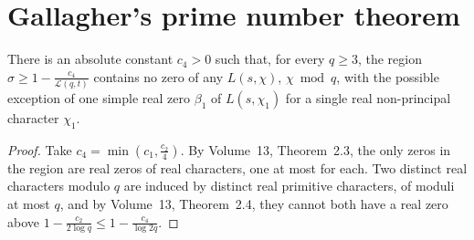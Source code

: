 \section{Gallagher's prime number theorem}

\begin{lemma}\label{lem:onezero}
There is an absolute constant $c_4>0$ such that, for every $q\ge3$, the region $\sigma\ge1-\frac{c_4}{\mathcal L(q,t)}$ contains no zero of any $L(s,\chi)$, $\chi\bmod q$, with the possible exception of one simple real zero $\beta_1$ of $L(s,\chi_1)$ for a single real non-principal character $\chi_1$.
\end{lemma}
\begin{proof}
Take $c_4=\min(c_1,\frac{c_2}4)$. By Volume~13, Theorem~2.3, the only zeros in the region are real zeros of real characters, one at most for each. Two distinct real characters modulo $q$ are induced by distinct real primitive characters, of moduli at most $q$, and by Volume~13, Theorem~2.4, they cannot both have a real zero above $1-\frac{c_2}{2\log q}\le1-\frac{c_4}{\log 2q}$.
\end{proof}

